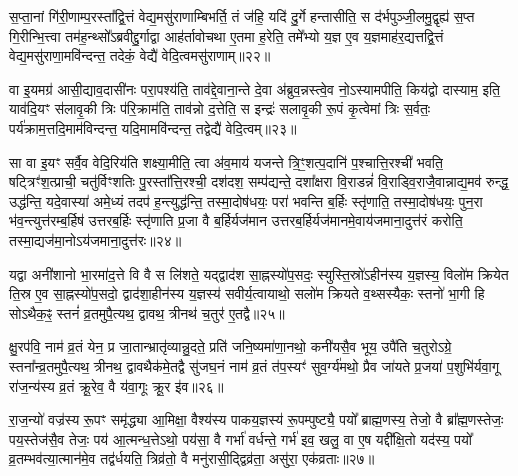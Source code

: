 स॒प्ता॒नां गि॑री॒णाम्प॒रस्ता᳚द्वि॒त्तं वेद्य॒मसु॑राणाम्बिभर्ति॒ तं ज॑हि॒ यदि॑ दु॒र्गे हन्तासीति॒ स द॑र्भपुञ्जी॒लमु॒द्वृह्य॑ स॒प्त गि॒रीन्भि॒त्त्वा तम॑ह॒न्थ्सो᳚\-ऽब्रवीद्दु॒र्गाद्वा आह॑र्तावोचथा ए॒तमा ह॒रेति॒ तमे᳚भ्यो य॒ज्ञ ए॒व य॒ज्ञमाह॑र॒द्यत्तद्वि॒त्तं वेद्य॒मसु॑राणा॒मवि॑न्दन्त॒ तदेकं॒ वेद्यै॑ वेदि॒त्वमसु॑राणाम्॥२२॥

वा इ॒यमग्र॑ आसी॒द्याव॒दासी॑नः परा॒पश्य॑ति॒ ताव॑द्दे॒वाना॒न्ते दे॒वा अ॑ब्रुव॒न्नस्त्वे॒व नो॒\-ऽस्यामपीति॒ किय॑द्वो दास्याम॒ इति॒ याव॑दि॒यꣳ स॑लावृ॒की त्रिः प॑रि॒क्राम॑ति॒ ताव॑न्नो द॒त्तेति॒ स इन्द्रः॑ सलावृ॒की रू॒पं कृ॒त्वेमां त्रिः स॒र्वतः॒ पर्य॑क्राम॒त्तदि॒माम॑विन्दन्त॒ यदि॒मामवि॑न्दन्त॒ तद्वेद्यै॑ वेदि॒त्वम्॥२३॥

सा वा इ॒यꣳ सर्वै॒व वेदि॒रिय॑ति शक्ष्या॒मीति॒ त्वा अ॑व॒माय॑ यजन्ते त्रि॒ꣳ॒शत्प॒दानि॑ प॒श्चात्ति॒रश्ची॑ भवति॒ षट्त्रिꣳ॑श॒त्प्राची॒ चतु॑र्विꣳशतिः पु॒रस्ता᳚त्ति॒रश्ची॒ दश॑दश॒ सम्प॑द्यन्ते॒ दशा᳚क्षरा वि॒राडन्नं॑ वि॒राड्वि॒राजै॒वान्नाद्य॒मव॑ रुन्द्ध॒ उद्ध॑न्ति॒ यदे॒वास्या॑ अमे॒ध्यं तदप॑ ह॒न्त्युद्ध॑न्ति॒ तस्मा॒दोष॑धयः॒ परा॑ भवन्ति ब॒र्\mbox{}हिः स्तृ॑णाति॒ तस्मा॒दोष॑धयः॒ पुन॒रा भ॑व॒न्त्युत्त॑रम्ब॒र्\mbox{}हिष॑ उत्तरब॒र्\mbox{}हिः स्तृ॑णाति प्र॒जा वै ब॒र्\mbox{}हिर्यज॑मान उत्तरब॒र्\mbox{}हिर्यज॑मानमे॒वाय॑जमाना॒दुत्त॑रं करोति॒ तस्मा॒द्यज॑मा॒नो\-ऽय॑जमाना॒दुत्त॑रः॥२४॥

{}

यद्वा अनी॑शानो भा॒रमा॑द॒त्ते वि वै स लि॑शते॒ यद्द्वाद॑श सा॒ह्नस्यो॑प॒सदः॒ स्युस्ति॒स्रो॑\-ऽहीन॑स्य य॒ज्ञस्य॒ विलो॑म क्रियेत ति॒स्र ए॒व सा॒ह्नस्यो॑प॒सदो॒ द्वाद॑शा॒हीन॑स्य य॒ज्ञस्य॑ सवीर्य॒त्वायाथो॒ सलो॑म क्रियते व॒थ्सस्यैकः॒ स्तनो॑ भा॒गी हि सो\-ऽथैक॒ꣴ॒ स्तनं॑ व्र॒तमुपै॒त्यथ॒ द्वावथ॒ त्रीनथ॑ च॒तुर॑ ए॒तद्वै॥२५॥

क्षु॒रप॑वि॒ नाम॑ व्र॒तं येन॒ प्र जा॒तान्भ्रातृ॑व्यान्नु॒दते॒ प्रति॑ जनि॒ष्यमा॑णा॒नथो॒ कनी॑यसै॒व भूय॒ उपै॑ति च॒तुरो\-ऽग्रे॒ स्तना᳚न्व्र॒तमुपै॒त्यथ॒ त्रीनथ॒ द्वावथैक॑मे॒तद्वै सु॑जघ॒नं नाम॑ व्र॒तं त॑प॒स्यꣳ॑ सुव॒र्ग्य॑मथो॒ प्रैव जा॑यते प्र॒जया॑ प॒शुभि॑र्यवा॒गू रा॑ज॒न्य॑स्य व्र॒तं क्रू॒रेव॒ वै य॑वा॒गूः क्रू॒र इ॑व॥२६॥

रा॒ज॒न्यो॑ वज्र॑स्य रू॒पꣳ समृ॑द्ध्या आ॒मिक्षा॒ वैश्य॑स्य पाकय॒ज्ञस्य॑ रू॒पम्पुष्ट्यै॒ पयो᳚ ब्राह्म॒णस्य॒ तेजो॒ वै ब्रा᳚ह्म॒णस्तेजः॒ पय॒स्तेज॑सै॒व तेजः॒ पय॑ आ॒त्मन्ध॒त्ते\-ऽथो॒ पय॑सा॒ वै गर्भा॑ वर्धन्ते॒ गर्भ॑ इव॒ खलु॒ वा ए॒ष यद्दी᳚क्षि॒तो यद॑स्य॒ पयो᳚ व्र॒तम्भव॑त्या॒त्मान॑मे॒व तद्व॑र्धयति॒ त्रिव्र॑तो॒ वै मनु॑रासी॒द्द्विव्र॑ता॒ असु॑रा॒ एक॑व्रताः॥२७॥

